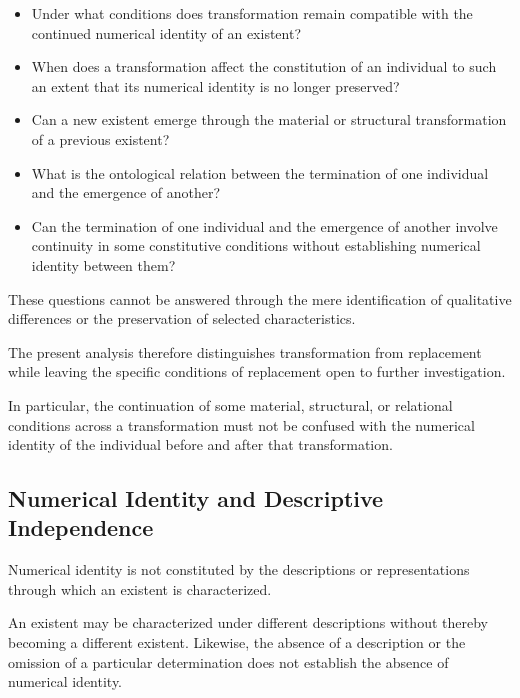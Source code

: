 \begin{itemize}
    \item Under what conditions does
    transformation remain compatible
    with the continued numerical identity
    of an existent?

    \item When does a transformation
    affect the constitution of an
    individual to such an extent that
    its numerical identity is no longer
    preserved?

    \item Can a new existent emerge
    through the material or structural
    transformation of a previous existent?

    \item What is the ontological relation
    between the termination of one
    individual and the emergence of
    another?

    \item Can the termination of one
    individual and the emergence of
    another involve continuity in some
    constitutive conditions without
    establishing numerical identity
    between them?
\end{itemize}

These questions cannot be answered
through the mere identification of
qualitative differences or the preservation
of selected characteristics.

The present analysis therefore distinguishes
transformation from replacement while
leaving the specific conditions of
replacement open to further investigation.

In particular, the continuation of
some material, structural, or relational
conditions across a transformation
must not be confused with the numerical
identity of the individual before
and after that transformation.

\subsection{Numerical Identity and Descriptive Independence}

Numerical identity is not constituted
by the descriptions or representations
through which an existent is characterized.

An existent may be characterized under
different descriptions without thereby
becoming a different existent. Likewise,
the absence of a description or the
omission of a particular determination
does not establish the absence of
numerical identity.

